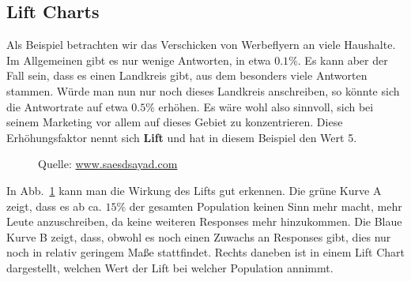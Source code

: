 \subsection{Lift Charts}
Als Beispiel betrachten wir das Verschicken von Werbeflyern an viele Haushalte. Im Allgemeinen
gibt es nur wenige Antworten, in etwa \(0.1\%\). Es kann aber der Fall sein, dass
es einen Landkreis gibt, aus dem besonders viele Antworten stammen. Würde man nun
nur noch dieses Landkreis anschreiben, so könnte sich die Antwortrate auf etwa
\(0.5\%\) erhöhen. Es wäre wohl also sinnvoll, sich bei seinem Marketing vor allem
auf dieses Gebiet zu konzentrieren. Diese Erhöhungsfaktor nennt sich
\textbf{Lift} und hat in diesem Beispiel den Wert 5. 
\begin{figure}[ht]
	\caption{Quelle: \href{http://www.saedsayad.com/model_evaluation_c.htm}{www.saesdsayad.com}}
	\label{fig:lift}
\end{figure}

\noindent In Abb.~\ref{fig:lift}  kann man die Wirkung des Lifts gut erkennen.
Die grüne Kurve A zeigt, dass es ab ca. \(15\%\) der gesamten Population keinen Sinn
mehr macht, mehr Leute anzuschreiben, da keine weiteren Responses mehr hinzukommen.
Die Blaue Kurve B zeigt, dass, obwohl es noch einen Zuwachs an Responses gibt, 
dies nur noch in relativ geringem Maße stattfindet. Rechts daneben ist in einem
Lift Chart dargestellt, welchen Wert der Lift bei welcher Population annimmt.

